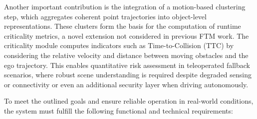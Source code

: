 Another important contribution is the integration of a motion-based clustering
step, which aggregates coherent point trajectories into object-level
representations. These clusters form the basis for the computation of runtime
criticality metrics, a novel extension not considered in previous FTM work.
The criticality module computes indicators such as Time-to-Collision (TTC) by
considering the relative velocity and distance between moving obstacles and the
ego trajectory. This enables quantitative risk assessment in
teleoperated fallback scenarios, where robust scene understanding is required
despite degraded sensing or connectivity or even an additional security layer when driving
autonomously.

To meet the outlined goals and ensure reliable operation in real-world
conditions, the system must fulfill the following functional and technical
requirements:


